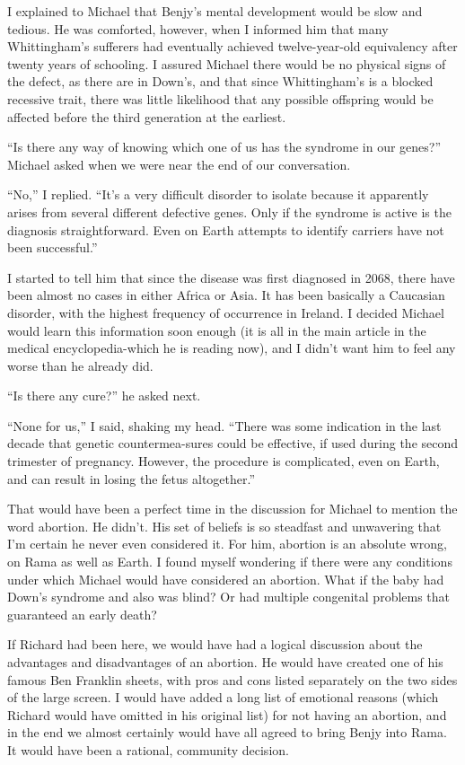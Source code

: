 \documentclass[]{article}
\begin{document}
I explained to Michael that Benjy’s mental development would be slow and tedious.  He was comforted, however, when I informed him that many Whittingham’s sufferers had eventually achieved twelve-year-old equivalency after twenty years of schooling.  I assured Michael there would be no physical signs of the defect, as there are in Down’s, and that since Whittingham’s is a blocked recessive trait, there was little likelihood that any possible offspring would be affected before the third generation at the earliest.

“Is there any way of knowing which one of us has the syndrome in our genes?” Michael asked when we were near the end of our conversation.

“No,” I replied.  “It’s a very difficult disorder to isolate because it apparently arises from several different defective genes.  Only if the syndrome is active is the diagnosis straightforward.  Even on Earth attempts to identify carriers have not been successful.”

I started to tell him that since the disease was first diagnosed in 2068, there have been almost no cases in either Africa or Asia.  It has been basically a Caucasian disorder, with the highest frequency of occurrence in Ireland.  I decided Michael would learn this information soon enough (it is all in the main article in the medical encyclopedia-which he is reading now), and I didn’t want him to feel any worse than he already did.

“Is there any cure?” he asked next.

“None for us,” I said, shaking my head.  “There was some indication in the last decade that genetic countermea-sures could be effective, if used during the second trimester of pregnancy.  However, the procedure is complicated, even on Earth, and can result in losing the fetus altogether.”

That would have been a perfect time in the discussion for Michael to mention the word abortion.  He didn’t.  His set of beliefs is so steadfast and unwavering that I’m certain he never even considered it.  For him, abortion is an absolute wrong, on Rama as well as Earth.  I found myself wondering if there were any conditions under which Michael would have considered an abortion.  What if the baby had Down’s syndrome and also was blind? Or had multiple congenital problems that guaranteed an early death?

If Richard had been here, we would have had a logical discussion about the advantages and disadvantages of an abortion.  He would have created one of his famous Ben Franklin sheets, with pros and cons listed separately on the two sides of the large screen.  I would have added a long list of emotional reasons (which Richard would have omitted in his original list) for not having an abortion, and in the end we almost certainly would have all agreed to bring Benjy into Rama.  It would have been a rational, community decision.
\end{document}
